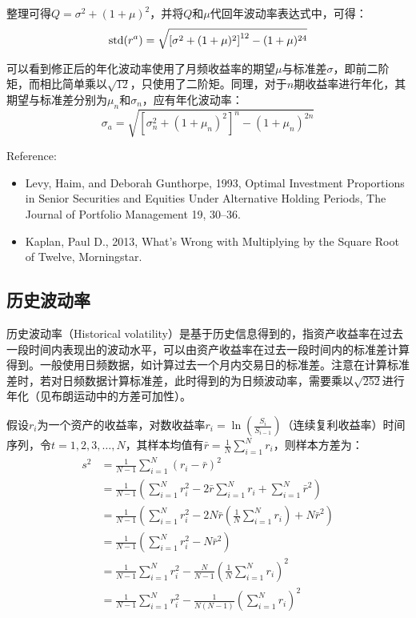 \documentclass[11pt]{article}
\begin{document}
整理可得$Q = \sigma^2 + (1+\mu)^2$，并将$Q$和$\mu$代回年波动率表达式中，可得：
\begin{equation*}
    \text{std}(r^a) = \sqrt{ \left[\sigma^2 + (1+\mu)^2\right]^{12} - (1+\mu)^{24}}
\end{equation*}

可以看到修正后的年化波动率使用了月频收益率的期望$\mu$与标准差$\sigma$，即前二阶矩，而相比简单乘以$\sqrt{12}$，只使用了二阶矩。同理，对于$n$期收益率进行年化，其期望与标准差分别为$\mu_n$和$\sigma_n$，应有年化波动率：
\begin{equation*}
    \sigma_a = \sqrt{ \left[\sigma_n^2 + (1+\mu_n)^2\right]^{n} - (1+\mu_n)^{2n} }
\end{equation*}

Reference:
\begin{itemize}
    \item Levy, Haim, and Deborah Gunthorpe, 1993, Optimal Investment Proportions in Senior Securities and Equities Under Alternative Holding Periods, The Journal of Portfolio Management 19, 30–36.
    \item Kaplan, Paul  D., 2013, What’s Wrong with Multiplying by the Square Root of Twelve, Morningstar.
\end{itemize}

\subsection{历史波动率}

历史波动率（Historical volatility）是基于历史信息得到的，指资产收益率在过去一段时间内表现出的波动水平，可以由资产收益率在过去一段时间内的标准差计算得到。一般使用日频数据，如计算过去一个月内交易日的标准差。注意在计算标准差时，若对日频数据计算标准差，此时得到的为日频波动率，需要乘以$\sqrt{252}$进行年化（见布朗运动中的方差可加性）。

假设$r_i$为一个资产的收益率，对数收益率$r_i = \ln \left( \frac{S_i}{S_{i-1}} \right)$（连续复利收益率）时间序列，令$t=1,2,3,\dots,N$，其样本均值有$\bar{r} = \frac{1}{N} \sum_{i=1}^{N}r_i$，则样本方差为：
\begin{align*}
    s^2 &= \frac{1}{N-1} \sum^N_{i=1} (r_i - \bar{r})^2 \\
    &= \frac{1}{N-1} \left( \sum^N_{i=1} r_i^2 - 2\bar{r} \sum^N_{i=1} r_i + \sum^N_{i=1} \bar{r}^2 \right) \\
    &= \frac{1}{N-1} \left( \sum^N_{i=1} r_i^2 - 2N\bar{r}\left(\frac{1}{N} \sum^N_{i=1} r_i \right) + N \bar{r}^2 \right) \\
    &= \frac{1}{N-1} \left( \sum^N_{i=1} r_i^2 - N \bar{r}^2 \right) \\
    &= \frac{1}{N-1} \sum^N_{i=1} r_i^2 - \frac{N}{N-1} \left( \frac{1}{N}  \sum^N_{i=1} r_i \right)^2 \\
    &= \frac{1}{N-1} \sum^N_{i=1} r_i^2 - \frac{1}{N(N-1)} \left( \sum^N_{i=1} r_i \right)^2
\end{align*}
\end{document}
